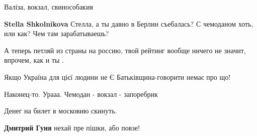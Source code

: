 \begin{itemize}
Валіза, вокзал, свинособакия🖕

 
\textbf{Stella Shkolnikova} Стелла, а ты давно в Берлин съебалась? С чемоданом хоть, или как? Чем там зарабатываешь?

 
А теперь петляй из страны на россию, твой рейтинг вообще ничего не значит, впрочем, как и ты \Smiley[1.0][yellow].

 
Якщо Україна для цієї людини не Є Батьківщина-говорити немає про що!

 
Наконец-то. Урааа.
Чемодан - вокзал - запоребрик

 
Денег на билет в московию скинуть.

\begin{itemize}
 
\textbf{Дмитрий Гуня} нехай пре пішки, або повзе!

 

\end{itemize}
\end{itemize}
